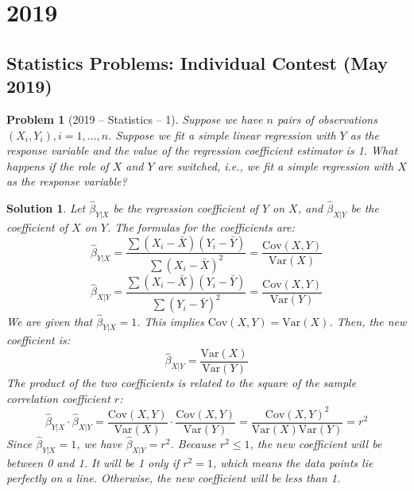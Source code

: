 \documentclass[12pt]{amsart}
\newtheorem{problem}{Problem}
\newtheorem*{solution}{Solution}
\begin{document}
\section*{2019}
\subsection*{Statistics Problems: Individual Contest (May 2019)}

\begin{problem}[2019 -- Statistics -- 1]
Suppose we have $n$ pairs of observations $(X_i, Y_i), i=1, \ldots, n$. Suppose we fit a simple linear regression with $Y$ as the response variable and the value of the regression coefficient estimator is 1. What happens if the role of $X$ and $Y$ are switched, i.e., we fit a simple regression with $X$ as the response variable?
\end{problem}
\begin{solution}
Let $\hat{\beta}_{Y|X}$ be the regression coefficient of $Y$ on $X$, and $\hat{\beta}_{X|Y}$ be the coefficient of $X$ on $Y$.
The formulas for the coefficients are:
$$ \hat{\beta}_{Y|X} = \frac{\sum (X_i - \bar{X})(Y_i - \bar{Y})}{\sum (X_i - \bar{X})^2} = \frac{\text{Cov}(X,Y)}{\text{Var}(X)} $$
$$ \hat{\beta}_{X|Y} = \frac{\sum (X_i - \bar{X})(Y_i - \bar{Y})}{\sum (Y_i - \bar{Y})^2} = \frac{\text{Cov}(X,Y)}{\text{Var}(Y)} $$
We are given that $\hat{\beta}_{Y|X} = 1$. This implies $\text{Cov}(X,Y) = \text{Var}(X)$.
Then, the new coefficient is:
$$ \hat{\beta}_{X|Y} = \frac{\text{Var}(X)}{\text{Var}(Y)} $$
The product of the two coefficients is related to the square of the sample correlation coefficient $r$:
$$ \hat{\beta}_{Y|X} \cdot \hat{\beta}_{X|Y} = \frac{\text{Cov}(X,Y)}{\text{Var}(X)} \cdot \frac{\text{Cov}(X,Y)}{\text{Var}(Y)} = \frac{\text{Cov}(X,Y)^2}{\text{Var}(X)\text{Var}(Y)} = r^2 $$
Since $\hat{\beta}_{Y|X}=1$, we have $\hat{\beta}_{X|Y} = r^2$.
Because $r^2 \le 1$, the new coefficient will be between 0 and 1. It will be 1 only if $r^2=1$, which means the data points lie perfectly on a line. Otherwise, the new coefficient will be less than 1.
\end{solution}
\end{document}
